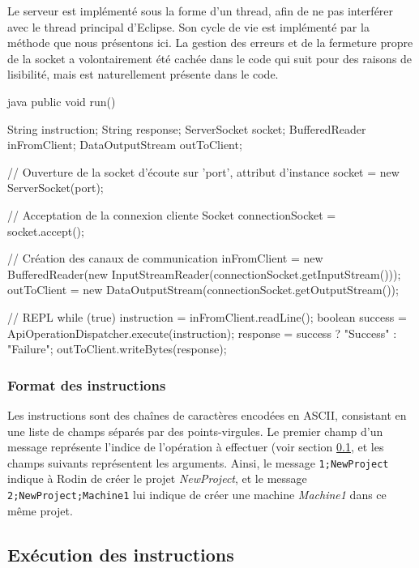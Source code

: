 Le serveur est implémenté sous la forme d'un thread, afin de ne pas interférer avec le thread principal d'Eclipse.
Son cycle de vie est implémenté par la méthode  que nous présentons ici.
La gestion des erreurs et de la fermeture propre de la socket a volontairement été cachée dans le code qui suit pour des raisons de lisibilité, mais est naturellement %
présente dans le code.

\begin{imtaCode}{java}
public void run() {
    String instruction;
    String response;
    ServerSocket socket;
    BufferedReader inFromClient;
    DataOutputStream outToClient;
    
    // Ouverture de la socket d'écoute sur 'port', attribut d'instance
    socket = new ServerSocket(port);
    
    // Acceptation de la connexion cliente
    Socket connectionSocket = socket.accept();
    
    // Création des canaux de communication
    inFromClient = new BufferedReader(new InputStreamReader(connectionSocket.getInputStream()));
    outToClient = new DataOutputStream(connectionSocket.getOutputStream());
    
    // REPL
    while (true) {
        instruction = inFromClient.readLine();
        boolean success = ApiOperationDispatcher.execute(instruction);
        response = success ? "Success" : "Failure";
        outToClient.writeBytes(response);
    }
}
\end{imtaCode}


\subsubsection*{Format des instructions}
Les instructions sont des chaînes de caractères encodées en ASCII, consistant en une liste de champs séparés par des points-virgules.
Le premier champ d'un message représente l'indice de l'opération à effectuer (voir section \ref{sec:instructionexecution}, et les champs suivants représentent les arguments.
Ainsi, le message \texttt{1;NewProject} indique à Rodin de créer le projet \textit{NewProject}, et le message \texttt{2;NewProject;Machine1} lui indique de créer une machine %
\textit{Machine1} dans ce même projet.
\\

\subsection{Exécution des instructions}\label{sec:instructionexecution}

